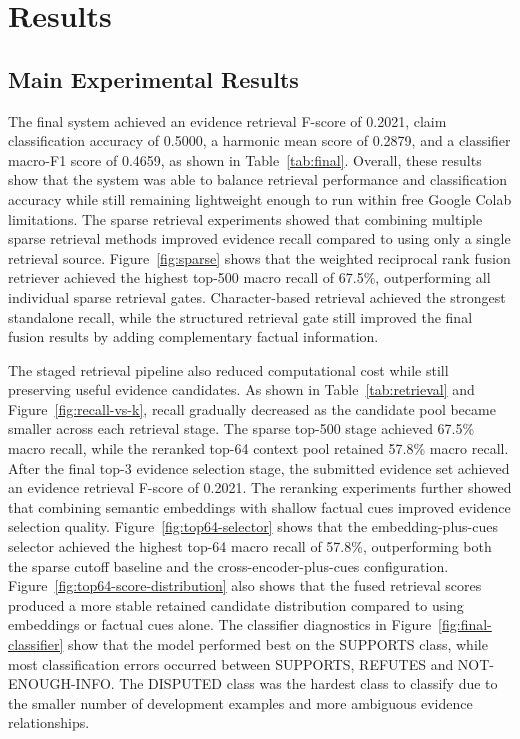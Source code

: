 \documentclass[11pt]{article}
\begin{document}
\FloatBarrier
\section{Results}

\subsection{Main Experimental Results}

The final system achieved an evidence retrieval F-score of 0.2021, claim
classification accuracy of 0.5000, a harmonic mean score of 0.2879, and a
classifier macro-F1 score of 0.4659, as shown in Table~\ref{tab:final}.
Overall, these results show that the system was able to balance retrieval
performance and classification accuracy while still remaining lightweight
enough to run within free Google Colab limitations. The sparse retrieval
experiments showed that combining multiple sparse retrieval methods improved
evidence recall compared to using only a single retrieval source.
Figure~\ref{fig:sparse} shows that the weighted reciprocal rank fusion
retriever achieved the highest top-500 macro recall of 67.5\%, outperforming
all individual sparse retrieval gates. Character-based retrieval achieved the
strongest standalone recall, while the structured retrieval gate still improved
the final fusion results by adding complementary factual information.

The staged retrieval pipeline also reduced computational cost while still
preserving useful evidence candidates. As shown in Table~\ref{tab:retrieval}
and Figure~\ref{fig:recall-vs-k}, recall gradually decreased as the candidate
pool became smaller across each retrieval stage. The sparse top-500 stage
achieved 67.5\% macro recall, while the reranked top-64 context pool retained
57.8\% macro recall. After the final top-3 evidence selection stage, the
submitted evidence set achieved an evidence retrieval F-score of 0.2021. The
reranking experiments further showed that combining semantic embeddings with
shallow factual cues improved evidence selection quality.
Figure~\ref{fig:top64-selector} shows that the embedding-plus-cues selector
achieved the highest top-64 macro recall of 57.8\%, outperforming both the
sparse cutoff baseline and the cross-encoder-plus-cues configuration.
Figure~\ref{fig:top64-score-distribution} also shows that the fused retrieval
scores produced a more stable retained candidate distribution compared to using
embeddings or factual cues alone. The classifier diagnostics in
Figure~\ref{fig:final-classifier} show that the model performed best on the
SUPPORTS class, while most classification errors occurred between SUPPORTS,
REFUTES and NOT-ENOUGH-INFO. The DISPUTED class was the hardest class to
classify due to the smaller number of development examples and more ambiguous
evidence relationships.
\end{document}
